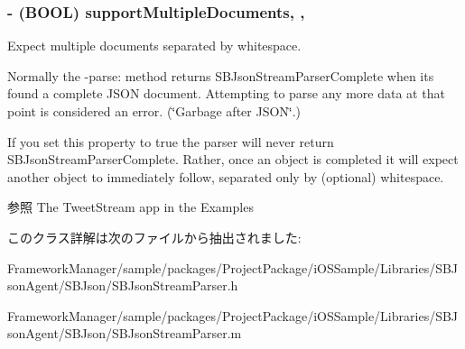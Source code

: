 \subsubsection[{support\+Multiple\+Documents}]{\setlength{\rightskip}{0pt plus 5cm}-\/ (B\+O\+O\+L) support\+Multiple\+Documents\hspace{0.3cm}{\ttfamily [read]}, {\ttfamily [write]}, {\ttfamily [atomic]}}\label{interface_s_b_json_stream_parser_afd976c605b67edbb8b7abbebcc5b4093}


Expect multiple documents separated by whitespace. 

Normally the {\ttfamily -\/parse}\+: method returns S\+B\+Json\+Stream\+Parser\+Complete when it\textquotesingle{}s found a complete J\+S\+O\+N document. Attempting to parse any more data at that point is considered an error. (\char`\"{}\+Garbage after J\+S\+O\+N\char`\"{}.)

If you set this property to true the parser will never return S\+B\+Json\+Stream\+Parser\+Complete. Rather, once an object is completed it will expect another object to immediately follow, separated only by (optional) whitespace.

\begin{DoxySeeAlso}{参照}
The Tweet\+Stream app in the Examples 
\end{DoxySeeAlso}


このクラス詳解は次のファイルから抽出されました\+:\begin{DoxyCompactItemize}
\item 
Framework\+Manager/sample/packages/\+Project\+Package/i\+O\+S\+Sample/\+Libraries/\+S\+B\+Json\+Agent/\+S\+B\+Json/S\+B\+Json\+Stream\+Parser.\+h\item 
Framework\+Manager/sample/packages/\+Project\+Package/i\+O\+S\+Sample/\+Libraries/\+S\+B\+Json\+Agent/\+S\+B\+Json/S\+B\+Json\+Stream\+Parser.\+m\end{DoxyCompactItemize}
